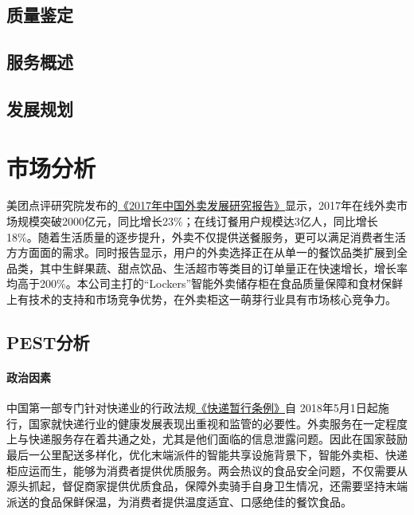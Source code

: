 \documentclass[violet]{main}
\begin{document}
		\section{质量鉴定}
		\section{服务概述}
		\section{发展规划}
	\chapter{市场分析}
		美团点评研究院发布的\href{http://b2b.toocle.com/detail--6431901.html}{《2017年中国外卖发展研究报告》}显示，2017年在线外卖市场规模突破2000亿元，同比增长23\%；在线订餐用户规模达3亿人，同比增长18\%。随着生活质量的逐步提升，外卖不仅提供送餐服务，更可以满足消费者生活方方面面的需求。同时报告显示，用户的外卖选择正在从单一的餐饮品类扩展到全品类，其中生鲜果蔬、甜点饮品、生活超市等类目的订单量正在快速增长，增长率均高于200\%。本公司主打的“Lockers”智能外卖储存柜在食品质量保障和食材保鲜上有技术的支持和市场竞争优势，在外卖柜这一萌芽行业具有市场核心竞争力。
		\section{PEST分析}
			\subsubsection{政治因素}
				中国第一部专门针对快递业的行政法规\href{http://www.xinhuanet.com/politics/2018-03/27/c\_1122599567.htm}{《快递暂行条例》}自 2018年5月1日起施行，国家就快递行业的健康发展表现出重视和监管的必要性。外卖服务在一定程度上与快递服务存在着共通之处，尤其是他们面临的信息泄露问题。因此在国家鼓励最后一公里配送多样化，优化末端派件的智能共享设施背景下，智能外卖柜、快递柜应运而生，能够为消费者提供优质服务。两会热议的食品安全问题，不仅需要从源头抓起，督促商家提供优质食品，保障外卖骑手自身卫生情况，还需要坚持末端派送的食品保鲜保温，为消费者提供温度适宜、口感绝佳的餐饮食品。
\end{document}
